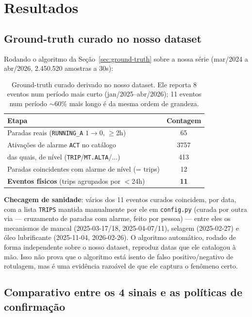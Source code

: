 \documentclass[11pt,a4paper]{article}
\begin{document}
\section{Resultados}

\subsection{Ground-truth curado no nosso dataset}
\label{sec:eventos-curados}

Rodando o algoritmo da Seção~\ref{sec:ground-truth} sobre a nossa série
(mar/2024 a abr/2026, 2.450.520 amostras a 30s):

\begin{table}[H]
\centering
\begin{tabular}{@{}lc@{}}
\toprule
\textbf{Etapa} & \textbf{Contagem} \\
\midrule
Paradas reais (\texttt{RUNNING\_A} $1\to0$, $\geq$2h) & 65 \\
Ativações de alarme \texttt{ACT} no catálogo & 3757 \\
\quad das quais, de nível (\texttt{TRIP}/\texttt{MT.ALTA}/...) & 413 \\
Paradas coincidentes com alarme de nível (= trips) & 12 \\
\textbf{Eventos físicos} (trips agrupados por $<$24h) & \textbf{11} \\
\bottomrule
\end{tabular}
\caption{Ground-truth curado derivado no nosso dataset. Ele reporta 8
eventos num período mais curto (jan/2025--abr/2026); 11 eventos num
período $\sim$60\% mais longo é da mesma ordem de grandeza.}
\end{table}

\textbf{Checagem de sanidade}: vários dos 11 eventos curados coincidem,
por data, com a lista \texttt{TRIPS} mantida manualmente por ele em
\texttt{config.py} (curada por outra via --- cruzamento de paradas com
alarme, feito por pessoa) --- entre eles os mecanismos de mancal
(2025-03-17/18, 2025-04-07/11), selagem (2025-02-27) e óleo lubrificante
(2025-11-04, 2026-02-26). O algoritmo automático, rodado de forma
independente sobre o nosso dataset, reproduz datas que ele catalogou à
mão. Isso não prova que o algoritmo está isento de falso positivo/negativo
de rotulagem, mas é uma evidência razoável de que ele captura o
fenômeno certo.

\subsection{Comparativo entre os 4 sinais e as políticas de confirmação}
\end{document}
